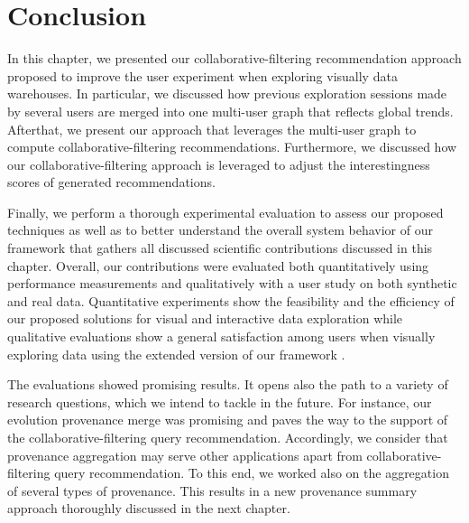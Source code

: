  \section{Conclusion}
 
In this chapter, we presented our collaborative-filtering recommendation approach proposed to improve the user experiment when exploring visually data warehouses.
{\color{Fuchsia}
In particular, we discussed how previous exploration sessions made by several users are merged into one multi-user graph that reflects global trends.
Afterthat, we present our approach that leverages the multi-user graph to compute collaborative-filtering recommendations.}
Furthermore, we discussed how our collaborative-filtering approach is leveraged to adjust the interestingness scores of generated recommendations.

 
Finally, we perform a thorough experimental evaluation to assess our proposed techniques as well as to better understand the overall system behavior of {\color{Fuchsia}our  framework \framework{} that gathers} all discussed scientific contributions discussed in this chapter.
Overall, our contributions were evaluated  both quantitatively using performance measurements and qualitatively with a user study on both synthetic and real data. 
Quantitative experiments show the feasibility and the efficiency of our proposed solutions for visual and interactive data exploration while qualitative evaluations show a general satisfaction among users when visually exploring data using the extended version of our framework {\color{Fuchsia}\framework{}}. 
  
  
  
  The evaluations showed promising results.  It opens also the path to a variety of research questions, which we intend to tackle in the future. For instance, our evolution provenance merge was promising 
 and paves the way to the support of the collaborative-filtering query recommendation.
  Accordingly, we consider that provenance aggregation may serve other applications apart from collaborative-filtering query recommendation.
   To this end, we worked also on the aggregation of several types of provenance. This results in a new provenance summary approach thoroughly discussed in the next chapter.




